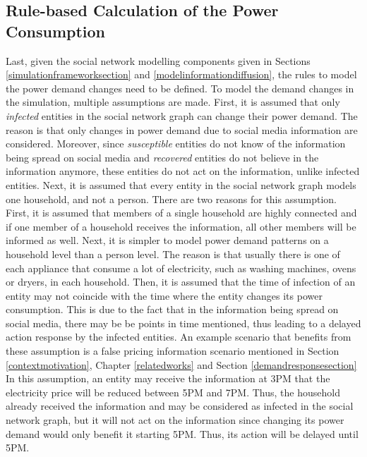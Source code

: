 \subsection{Rule-based Calculation of the Power Consumption}
\label{rulebasedpowerconsumption}

Last, given the social network modelling components given in 
Sections \ref{simulationframeworksection} and 
\ref{modelinformationdiffusion}, the rules to model the
power demand changes need to be defined.
To model the demand changes in the simulation, multiple assumptions
are made.
First, it is assumed that only \textit{infected} entities in 
the social network graph
can change their power demand. The reason is 
that only changes in power demand due to social media information
are considered. Moreover, since \textit{susceptible} entities
do not know of the information being spread on social media and 
\textit{recovered} entities do not believe in the information anymore,
these entities do not act on the information, unlike infected
entities.
Next, it is assumed that every entity in the social network graph 
models one household, and not a person. There are 
two reasons for this assumption. First, it is assumed that 
members of a single household are highly connected and if one 
member of a household receives the information, all other members
will be informed as well. Next, it is simpler to model power demand
patterns on a household level than a person level. The reason
is that usually
there is one of each appliance that consume a lot of electricity, 
such as washing machines, ovens or dryers, in each household.
Then, it is assumed that the time of infection of an entity may not
coincide with the time where the entity changes its 
power consumption. This is due to the fact that in the information
being spread on social media, there may be be points in time
mentioned, thus leading to a delayed action response by the
infected entities. An example scenario that benefits
from these assumption is a false pricing information scenario 
mentioned in Section \ref{contextmotivation}, Chapter 
\ref{relatedworks} and Section \ref{demandresponsesection} 
In this assumption, an entity may receive the information 
at 3PM that the electricity price will be reduced 
between 5PM and 7PM. Thus, the household already received the
information and may be considered as infected in the social network
graph, but it will not act on the information since changing
its power demand would only benefit it starting 5PM. Thus, its 
action will be delayed until 5PM. 

